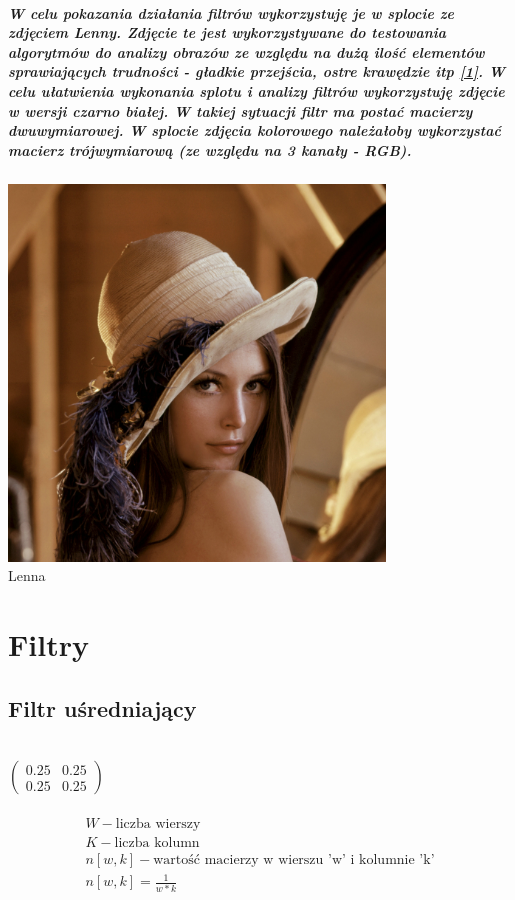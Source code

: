 \documentclass[a4paper,12pt,openany]{report}
\begin{document}
\paragraph{\indent W celu pokazania działania filtrów wykorzystuję je w splocie ze zdjęciem Lenny. Zdjęcie te jest wykorzystywane do testowania algorytmów do analizy obrazów ze względu na dużą ilość elementów sprawiających trudności - gładkie przejścia, ostre krawędzie itp \href{https://en.wikipedia.org/wiki/Lenna}{[1]}. W celu ułatwienia wykonania splotu i analizy filtrów wykorzystuję zdjęcie w wersji czarno białej. W takiej sytuacji filtr ma postać macierzy dwuwymiarowej. W splocie zdjęcia kolorowego należałoby wykorzystać macierz trójwymiarową (ze względu na 3 kanały - RGB).}

\begin{center}
\includegraphics[width=10cm]{resources/Lena.jpg}\\
\tiny{Lenna}
\end{center}

\chapter{Filtry}

\section{Filtr uśredniający}
\\
\linebreak
$\begin{pmatrix}
0.25 & 0.25\\
0.25 & 0.25
\end{pmatrix}$
\\
\linebreak
{}
\\
\linebreak
\begin{gather*}
W - \text{liczba wierszy} \\
K - \text{liczba kolumn} \\
n[w, k] - \text{wartość macierzy w wierszu 'w' i kolumnie 'k'} \\
n[w, k] = \frac{1}{w*k}\\
\end{gather*}
\end{document}
